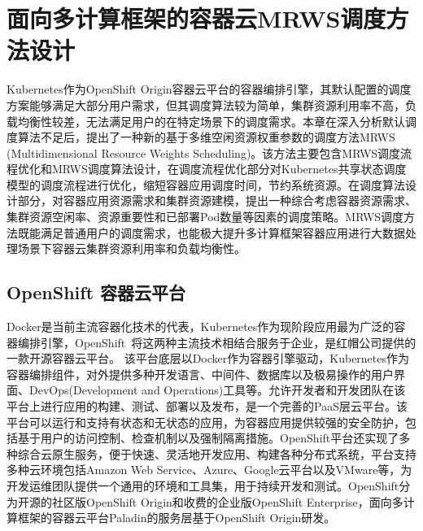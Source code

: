 \chapter{面向多计算框架的容器云MRWS调度方法设计}
Kubernetes作为OpenShift Origin容器云平台的容器编排引擎，其默认配置的调度方案能够满足大部分用户需求，但其调度算法较为简单，集群资源利用率不高，负载均衡性较差，无法满足用户的在特定场景下的调度需求。本章在深入分析默认调度算法不足后，提出了一种新的基于多维空闲资源权重参数的调度方法MRWS (Multidimensional Resource Weights Scheduling)。该方法主要包含MRWS调度流程优化和MRWS调度算法设计，在调度流程优化部分对Kubernetes共享状态调度模型的调度流程进行优化，缩短容器应用调度时间，节约系统资源。在调度算法设计部分，对容器应用资源需求和集群资源建模，提出一种综合考虑容器资源需求、集群资源空闲率、资源重要性和已部署Pod数量等因素的调度策略。MRWS调度方法既能满足普通用户的调度需求，也能极大提升多计算框架容器应用进行大数据处理场景下容器云集群资源利用率和负载均衡性。

\section{OpenShift 容器云平台}
Docker是当前主流容器化技术的代表，Kubernetes作为现阶段应用最为广泛的容器编排引擎，OpenShift~\cite{Lossent2017PaaS}将这两种主流技术相结合服务于企业，是红帽公司提供的一款开源容器云平台。
该平台底层以Docker作为容器引擎驱动，Kubernetes作为容器编排组件，对外提供多种开发语言、中间件、数据库以及极易操作的用户界面、DevOps(Development and Operations)工具等。允许开发者和开发团队在该平台上进行应用的构建、测试、部署以及发布，是一个完善的PaaS层云平台。该平台可以运行和支持有状态和无状态的应用，为容器应用提供较强的安全防护，包括基于用户的访问控制、检查机制以及强制隔离措施。OpenShift平台还实现了多种综合云原生服务，便于快速、灵活地开发应用、构建各种分布式系统，平台支持多种云环境包括Amazon Web Service、Azure、Google云平台以及VMware等，为开发运维团队提供一个通用的环境和工具集，用于持续开发和测试。OpenShift分为开源的社区版OpenShift Origin和收费的企业版OpenShift Enterprise，面向多计算框架的容器云平台Paladin的服务层基于OpenShift Origin研发。

